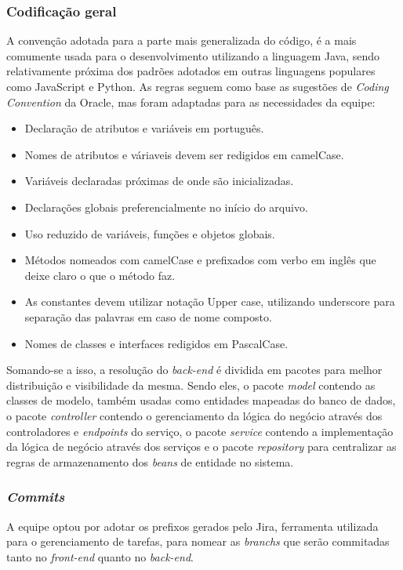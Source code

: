 \documentclass[
    12pt,               %
    openright,          %
    oneside,
    a4paper,            %
    BIBLATEX,           %
    TODO,               %
    english,            %
    brazil              %
    ]{ifsp-spo-inf-ctds}
\begin{document}
        \subsubsection{Codificação geral}
        A convenção adotada para a parte mais generalizada do código, é a mais comumente usada para o desenvolvimento utilizando a linguagem Java, sendo relativamente próxima dos padrões adotados em outras linguagens populares como JavaScript e Python. As regras seguem como base as sugestões de \emph{Coding Convention }da Oracle, mas foram adaptadas para as necessidades da equipe:

        \begin{itemize}
            \item
            Declaração de atributos e variáveis em português.
            \item
            Nomes de atributos e váriaveis devem ser redigidos em camelCase.
            \item
            Variáveis declaradas próximas de onde são inicializadas.
            \item
            Declarações globais preferencialmente no início do arquivo.
            \item
            Uso reduzido de variáveis, funções e objetos globais.
            \item
            Métodos nomeados com camelCase e prefixados com verbo em inglês que deixe claro o que o método faz.
            \item
            As constantes devem utilizar notação Upper case, utilizando underscore para separação das palavras em caso de nome composto.
            \item
            Nomes de classes e interfaces redigidos em PascalCase.
        \end{itemize}

    Somando-se a isso, a resolução do \emph{back-end} é dividida em pacotes para melhor distribuição e visibilidade da mesma. Sendo eles, o pacote \emph{model} contendo as classes de modelo, também usadas como entidades mapeadas do banco de dados, o pacote \emph{controller} contendo o gerenciamento da lógica do negócio através dos controladores e \emph{endpoints} do serviço, o pacote \emph{service} contendo a implementação da lógica de negócio através dos serviços e o pacote \emph{repository} para centralizar as regras de armazenamento dos \emph{beans} de entidade no sistema.

    \subsubsection{\emph{Commits}}
    A equipe optou por adotar os prefixos gerados pelo Jira, ferramenta utilizada para o gerenciamento de tarefas, para nomear as \emph{branchs} que serão commitadas tanto no \emph{front-end} quanto no \emph{back-end}.
\end{document}
